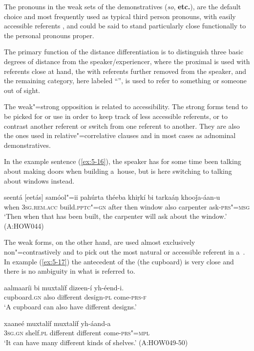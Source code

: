 The pronouns in the weak  sets of the demonstratives (\textit{so}, \textbf{etc.}), are the default choice and most frequently used as typical third person pronouns, with easily accessible  referents \citep[432--433]{diessel2006}, and could be said to stand particularly close functionally to the personal pronouns proper. 

The primary function of the distance differentiation is to distinguish three basic degrees of distance from the speaker/experiencer, where the proximal is used with referents close at hand, the  with referents further removed from the speaker, and the remaining category, here labeled ``'', is used to refer to something or someone out of sight. 


The weak"=strong opposition is related to accessibility. The strong forms tend to be picked for  or  use in order to keep track of less accessible  referents, or to contrast another referent or switch from one referent to another. They are also the ones used in relative"=correlative clauses and in most cases as adnominal demonstratives. 


In the example sentence (\ref{ex:5-16}), the speaker has for some time been talking about making doors when building a~house, but is here switching to talking about windows instead.


\begin{exe}
\ex
\label{ex:5-16}
\gll seentá [eetás] samóol"=ii pahúrta théeba khiṛkí bi tarkaáṇ
khooǰa-áan-u  \\
when \textsc{3sg}.\textsc{rem.acc} build.\textsc{pptc"=gn} after then window also carpenter ask-\textsc{prs"=msg} \\
\glt `Then when that has been built, the carpenter will ask about the window.' (A:HOW044)
\end{exe}

The weak forms, on the other hand, are used almost exclusively non"=contrastively and to pick out the
most natural or accessible referent in a~. In example (\ref{ex:5-17}) the antecedent of the 
(the cupboard) is very close and there is no ambiguity in what is referred to.

\begin{exe}
\ex
\label{ex:5-17}
\gll aalmaaríi bi muxtalíf dizeen-í yh-éend-i. \\
cupboard.\textsc{gn} also different design-\textsc{pl} come-\textsc{prs-f} \\
\glt `A cupboard can also have different designs.' 

\gll [tasíi] xaaneé muxtalíf muxtalíf yh-áand-a \\
\textsc{3sg.gn} shelf.\textsc{pl} different different come-\textsc{prs"=mpl} \\
\glt `It can have many different kinds of shelves.' (A:HOW049-50)
\end{exe}

